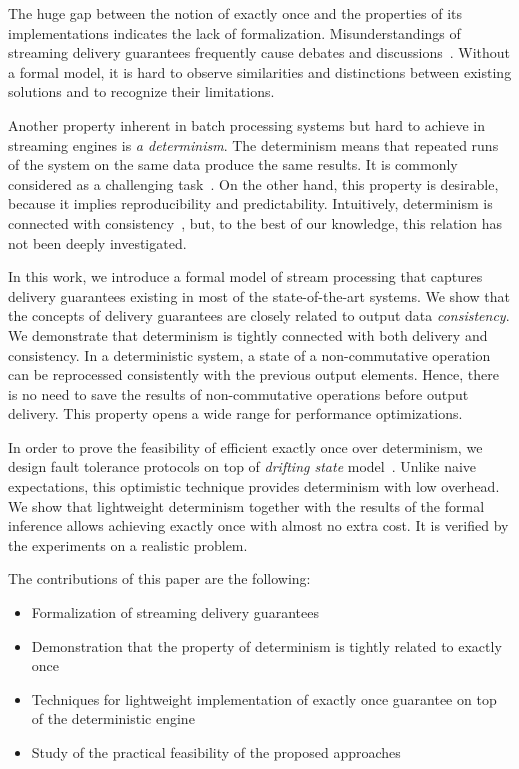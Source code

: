 The huge gap between the notion of exactly once and the properties of its implementations indicates the lack of formalization. Misunderstandings of streaming delivery guarantees frequently cause debates and discussions~\cite{JerryPengStreamIO, PaperTrail}. Without a formal model, it is hard to observe similarities and distinctions between existing solutions and to recognize their limitations.

Another property inherent in batch processing systems but hard to achieve in streaming engines is {\em a determinism}. 
The determinism means that repeated runs of the system on the same data produce the same results. It is commonly considered as a challenging task~\cite{Zacheilas:2017:MDS:3093742.3093921}. 
On the other hand, this property is desirable, because it implies reproducibility and predictability. 
Intuitively, determinism is connected with consistency~\cite{Stonebraker:2005:RRS:1107499.1107504}, but, to the best of our knowledge, this relation has not been deeply investigated. 

In this work, we introduce a formal model of stream processing that captures delivery guarantees existing in most of the state-of-the-art systems. We show that the concepts of delivery guarantees are closely related to output data {\em consistency}. We demonstrate that determinism is tightly connected with both delivery and consistency. In a deterministic system, a state of a non-commutative operation can be reprocessed consistently with the previous output elements. Hence, there is no need to save the results of non-commutative operations before output delivery. This property opens a wide range for performance optimizations.

In order to prove the feasibility of efficient exactly once over determinism, we design fault tolerance protocols on top of {\em drifting state} model~\cite{we2018adbis}. Unlike naive expectations, this optimistic technique provides determinism with low overhead. We show that lightweight determinism together with the results of the formal inference allows achieving exactly once with almost no extra cost. It is verified by the experiments on a realistic problem.

The contributions of this paper are the following: 
\begin{itemize}
    \item Formalization of streaming delivery guarantees 
    \item Demonstration that the property of determinism is tightly related to exactly once
    \item Techniques for lightweight implementation of exactly once guarantee on top of the deterministic engine
    \item Study of the practical feasibility of the proposed approaches
\end{itemize}

